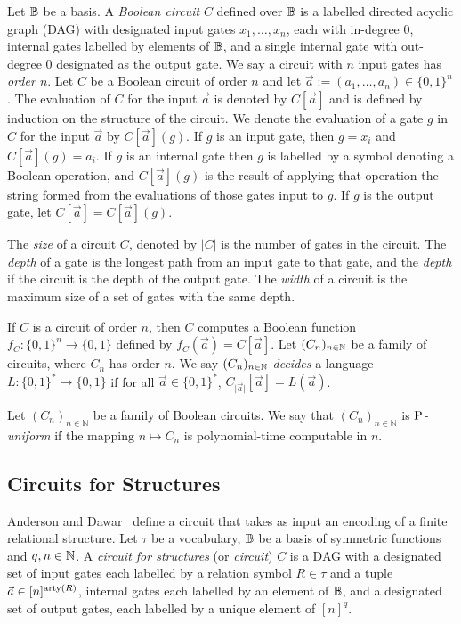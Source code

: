 \documentclass[../paper.tex]{subfiles}
\begin{document}
Let $\mathbb{B}$ be a basis. A \emph{Boolean circuit} $C$ defined over $\mathbb{B}$ is a
labelled directed acyclic graph (DAG) with designated input gates $x_1, \ldots,
x_n$, each with in-degree $0$, internal gates labelled by elements of $\mathbb{B}$, and
a single internal gate with out-degree $0$ designated as the output gate. We say
a circuit with $n$ input gates has \emph{order $n$}. Let $C$ be a Boolean
circuit of order $n$ and let $\vec{a} := (a_1, \ldots, a_n) \in \{0,1\}^n$. The
evaluation of $C$ for the input $\vec{a}$ is denoted by $C[\vec{a}]$ and is
defined by induction on the structure of the circuit. We denote the evaluation
of a gate $g$ in $C$ for the input $\vec{a}$ by $C[\vec{a}](g)$. If $g$ is an
input gate, then $g = x_i$ and $C[\vec{a}](g) = a_i$. If $g$ is an internal gate
then $g$ is labelled by a symbol denoting a Boolean operation, and
$C[\vec{a}](g)$ is the result of applying that operation the string formed from
the evaluations of those gates input to $g$. If $g$ is the output gate, let
$C[\vec{a}] = C[\vec{a}](g)$.

The \emph{size} of a circuit $C$, denoted by $\vert C \vert$ is the number of
gates in the circuit. The \emph{depth} of a gate is the longest path from an
input gate to that gate, and the \emph{depth} if the circuit is the depth of the
output gate. The \emph{width} of a circuit is the maximum size of a set of gates
with the same depth.

If $C$ is a circuit of order $n$, then $C$ computes a Boolean function $f_C :
\{0,1\}^n \rightarrow \{0,1\}$ defined by $f_C(\vec{a}) = C[\vec{a}]$. Let
$(C_n)_{n \in \mathbb{N}}$ be a family of circuits, where $C_n$ has order $n$. We say
$(C_n)_{n \in \mathbb{N}}$ \emph{decides} a language $L : \{0,1\}^{*} \rightarrow
\{0,1\}$ if for all $\vec{a} \in \{0,1\}^{*}$, $C_{\vert \vec{a} \vert}
[\vec{a}] = L(\vec{a})$.


\begin{definition}
  Let $(C_n)_{n \in \mathbb{N}}$ be a family of Boolean circuits. We say that
  $(C_n)_{n \in \mathbb{N}}$ is \emph{$\mathrm{P}$-uniform} if the mapping $n \mapsto
  C_n$ is polynomial-time computable in $n$.
\end{definition}

\subsection{Circuits for Structures}
Anderson and Dawar~\cite{AndersonD17} define a circuit that takes as input an
encoding of a finite relational structure. Let $\tau$ be a vocabulary, $\mathbb{B}$ be
a basis of symmetric functions and $q, n \in \mathbb{N}$. A \emph{circuit for
  structures} (or \emph{circuit}) $C$ is a DAG with a designated set of input
gates each labelled by a relation symbol $R \in \tau$ and a tuple $\vec{a} \in
[n]^{\mathrm{arty}(R)}$, internal gates each labelled by an element of $\mathbb{B}$, and a
designated set of output gates, each labelled by a unique element of $[n]^q$.
\end{document}
